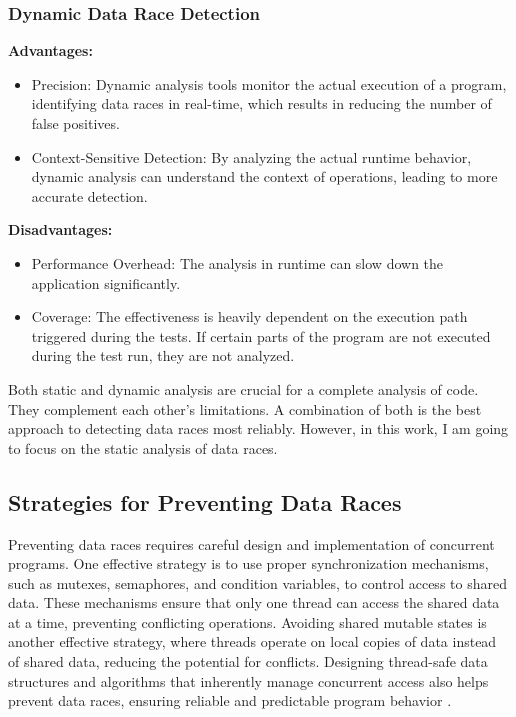 \documentclass[
fancyheadings, %
%
%
]{stsreprt}
\begin{document}
{\subsubsection{Dynamic Data Race Detection \cite{flanagan2009}}
\textbf{Advantages:}
\begin{itemize}
	\item Precision: Dynamic analysis tools monitor the actual execution of a program, identifying data races in real-time, which results in reducing the number of false positives.
	\item Context-Sensitive Detection: By analyzing the actual runtime behavior, dynamic analysis can understand the context of operations, leading to more accurate detection. 
\end{itemize}
\textbf{Disadvantages:}
\begin{itemize}
	\item Performance Overhead: The analysis in runtime can slow down the application significantly. 
	\item Coverage: The effectiveness is heavily dependent on the execution path triggered during the tests. If certain parts of the program are not executed during the test run, they are not analyzed.
\end{itemize}

Both static and dynamic analysis are crucial for a complete analysis of code. They complement each other's limitations. A combination of both is the best approach to detecting data races most reliably. However, in this work, I am going to focus on the static analysis of data races.

\subsection{Strategies for Preventing Data Races}

Preventing data races requires careful design and implementation of concurrent programs. One effective strategy is to use proper synchronization mechanisms, such as mutexes, semaphores, and condition variables, to control access to shared data. These mechanisms ensure that only one thread can access the shared data at a time, preventing conflicting operations. Avoiding shared mutable states is another effective strategy, where threads operate on local copies of data instead of shared data, reducing the potential for conflicts. Designing thread-safe data structures and algorithms that inherently manage concurrent access also helps prevent data races, ensuring reliable and predictable program behavior \cite{herlihy2008}.

}
\end{document}
